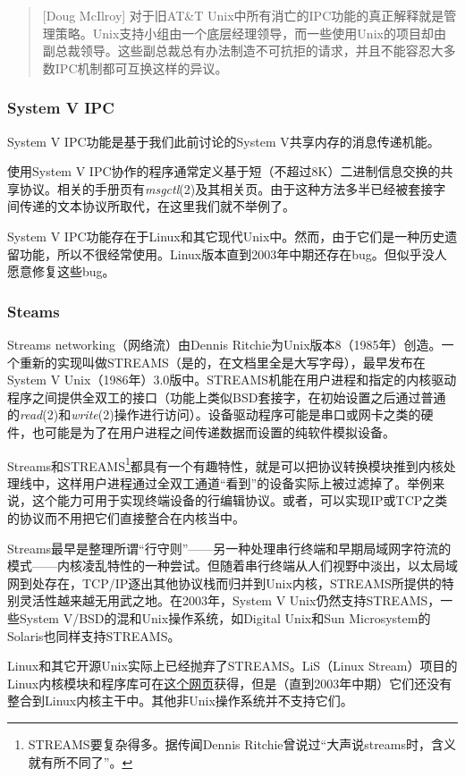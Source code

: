 \documentclass[12pt,oneside]{book}
\begin{document}
\begin{quote}[Doug McIlroy] 
对于旧AT\&{}T Unix中所有消亡的IPC功能的真正解释就是管理策略。Unix支持小组由一个底层经理领导，而一些使用Unix的项目却由副总裁领导。这些副总裁总有办法制造不可抗拒的请求，并且不能容忍大多数IPC机制都可互换这样的异议。
\end{quote}

\subsubsection{System V IPC}
System V IPC功能是基于我们此前讨论的System V共享内存的消息传递机能。

使用System V IPC协作的程序通常定义基于短（不超过8K）二进制信息交换的共享协议。相关的手册页有\textit{msgctl}(2)及其相关页。由于这种方法多半已经被套接字间传递的文本协议所取代，在这里我们就不举例了。

System V IPC功能存在于Linux和其它现代Unix中。然而，由于它们是一种历史遗留功能，所以不很经常使用。Linux版本直到2003年中期还存在bug。但似乎没人愿意修复这些bug。


\subsubsection{Steams}
Streams networking（网络流）由Dennis Ritchie为Unix版本8（1985年）创造。一个重新的实现叫做STREAMS（是的，在文档里全是大写字母），最早发布在System V Unix（1986年）3.0版中。STREAMS机能在用户进程和指定的内核驱动程序之间提供全双工的接口（功能上类似BSD套接字，在初始设置之后通过普通的\textit{read}(2)和\textit{write}(2)操作进行访问）。设备驱动程序可能是串口或网卡之类的硬件，也可能是为了在用户进程之间传递数据而设置的纯软件模拟设备。

Streams和STREAMS\footnote{STREAMS要复杂得多。据传闻Dennis Ritchie曾说过“大声说streams时，含义就有所不同了”。}都具有一个有趣特性，就是可以把协议转换模块推到内核处理线中，这样用户进程通过全双工通道“看到”的设备实际上被过滤掉了。举例来说，这个能力可用于实现终端设备的行编辑协议。或者，可以实现IP或TCP之类的协议而不用把它们直接整合在内核当中。

Streams最早是整理所谓“行守则”——另一种处理串行终端和早期局域网字符流的模式——内核凌乱特性的一种尝试。但随着串行终端从人们视野中淡出，以太局域网到处存在，TCP/IP逐出其他协议栈而归并到Unix内核，STREAMS所提供的特别灵活性越来越无用武之地。在2003年，System V Unix仍然支持STREAMS，一些System V/BSD的混和Unix操作系统，如Digital Unix和Sun Microsystem的Solaris也同样支持STREAMS。

Linux和其它开源Unix实际上已经抛弃了STREAMS。LiS（Linux Stream）项目的Linux内核模块和程序库可在\href{http://www.gcom.com/home/linux/lis/}{这个网页}获得，但是（直到2003年中期）它们还没有整合到Linux内核主干中。其他非Unix操作系统并不支持它们。
\end{document}
